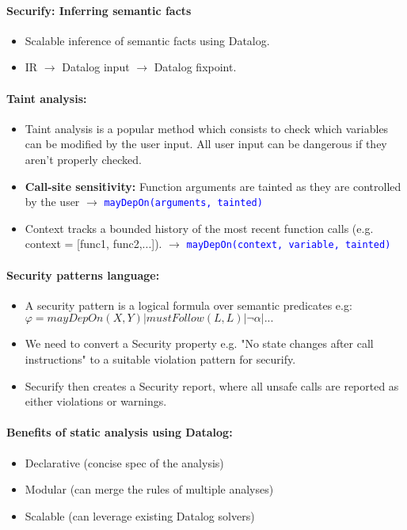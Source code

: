 \paragraph{Securify: Inferring semantic facts}
\begin{itemize}
    \item Scalable inference of semantic facts using Datalog.
    \item IR $\xrightarrow{}$ Datalog input $\xrightarrow{}$ Datalog fixpoint.
\end{itemize}{}

\begin{minipage}{0.9\linewidth}
    \centering      
    \def\svgwidth{\linewidth}
        
\end{minipage}

\paragraph{Taint analysis:} 
\begin{itemize}
    \item Taint analysis is a popular method which consists to check which variables can be modified by the user input. All user input can be dangerous if they aren't properly checked.
    \item \textbf{Call-site sensitivity: }Function arguments are tainted as they are controlled by the user $\rightarrow$ \textcolor{blue}{\texttt{mayDepOn(arguments, tainted)}}
    \item Context tracks a bounded history of the most recent function calls (e.g. context = [func1, func2,...]). $\rightarrow$  \textcolor{blue}{\texttt{mayDepOn(context, variable, tainted)}}
\end{itemize}{}

\paragraph{Security patterns language:}
\begin{itemize}
    \item A security pattern is a logical formula over semantic predicates e.g:\\
    $\varphi = mayDepOn(X,Y) | mustFollow(L,L) | \neg \alpha | ...$
    \item We need to convert a Security property e.g. "No state changes after call instructions" to a suitable violation pattern for securify.
    \item Securify then creates a Security report, where all unsafe calls are reported as either violations or warnings.
\end{itemize}{}

\paragraph{Benefits of static analysis using Datalog:}
\begin{itemize}
    \item Declarative (concise spec of the analysis)
    \item Modular (can merge the rules of multiple analyses)
    \item Scalable (can leverage existing Datalog solvers)
\end{itemize}{}